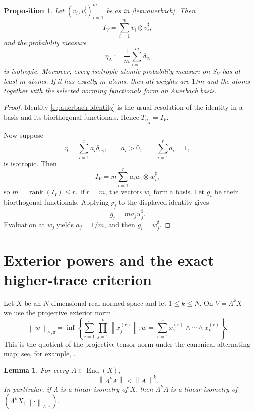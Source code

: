 \documentclass[11pt,a4paper]{amsart}
\numberwithin{equation}{section}
\theoremstyle{plain}
\newtheorem{proposition}[theorem]{Proposition}
\newtheorem{lemma}[theorem]{Lemma}
\theoremstyle{definition}
\theoremstyle{remark}
\DeclareMathOperator{\End}{End}
\DeclareMathOperator{\rank}{rank}
\newcommand{\Id}{I}
\newcommand{\norm}[1]{\left\|#1\right\|}
\begin{document}
\begin{proposition}\label{prop:atomic}
Let $(v_i,v_i^\sharp)_{i=1}^m$ be as in \cref{lem:auerbach}. Then
\begin{equation}\label{eq:auerbach-identity}
\Id_V=\sum_{i=1}^m v_i\otimes v_i^\sharp,
\end{equation}
and the probability measure
\[
\eta_{\mathrm{A}}:=\frac1m\sum_{i=1}^m\delta_{v_i}
\]
is isotropic. Moreover, every isotropic atomic probability measure on $S_V$ has at least $m$ atoms. If it has exactly $m$ atoms, then all weights are $1/m$ and the atoms together with the selected norming functionals form an Auerbach basis.
\end{proposition}

\begin{proof}
Identity \eqref{eq:auerbach-identity} is the usual resolution of the identity in a basis and its biorthogonal functionals. Hence $T_{\eta_{\mathrm A}}=\Id_V$.

Now suppose
\[
\eta=\sum_{i=1}^r a_i\delta_{w_i},
\qquad a_i>0,
\qquad \sum_{i=1}^r a_i=1,
\]
is isotropic. Then
\[
\Id_V=m\sum_{i=1}^r a_iw_i\otimes w_i^\sharp,
\]
so $m=\rank(\Id_V)\leqslant r$. If $r=m$, the vectors $w_i$ form a basis. Let $g_i$ be their biorthogonal functionals. Applying $g_j$ to the displayed identity gives
\[
g_j=ma_jw_j^\sharp.
\]
Evaluation at $w_j$ yields $a_j=1/m$, and then $g_j=w_j^\sharp$.
\end{proof}

\section{Exterior powers and the exact higher-trace criterion}\label{sec:exterior}

Let $X$ be an $N$-dimensional real normed space and let $1\leqslant k\leqslant N$. On $V=\Lambda^kX$ we use the projective exterior norm
\begin{equation}\label{eq:exterior-projective}
\norm{w}_{\wedge,\pi}
=\inf\left\{\sum_{r=1}^s\prod_{j=1}^k\norm{x_j^{(r)}}:
 w=\sum_{r=1}^s x_1^{(r)}\wedge\cdots\wedge x_k^{(r)}\right\}.
\end{equation}
This is the quotient of the projective tensor norm under the canonical alternating map; see, for example, \cite{QuasThieullenZarrabi}.

\begin{lemma}\label{lem:exterior-bound}
For every $A\in\End(X)$,
\[
\norm{\Lambda^kA}\leqslant\norm{A}^k.
\]
In particular, if $A$ is a linear isometry of $X$, then $\Lambda^kA$ is a linear isometry of $(\Lambda^kX,\norm{\cdot}_{\wedge,\pi})$.
\end{lemma}
\end{document}
